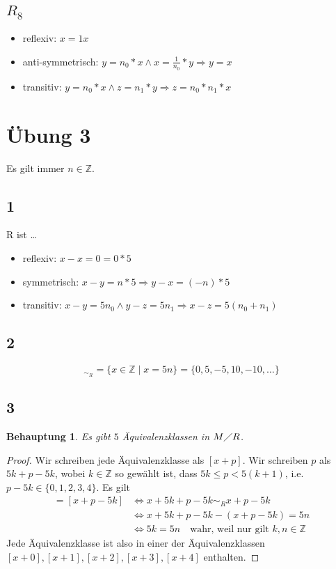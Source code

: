 \documentclass[a4paper,10pt]{article}
\newtheorem*{claim}{Behauptung}
\begin{document}
\subsection*{$R_8$}

\begin{itemize}
 \item reflexiv: $x = 1x$
 \item anti-symmetrisch: $y = n_0 * x \land x = \frac{1}{n_0} * y \Rightarrow y = x$
 \item transitiv: $y = n_0 * x \land z = n_1 * y \Rightarrow z = n_0 * n_1 * x$
\end{itemize}

\section*{Übung 3}

Es gilt immer $n \in \mathbb{Z}$.

\subsection*{1}

R ist \dots
\begin{itemize}
 \item reflexiv: $x - x = 0 = 0 * 5$
 \item symmetrisch: $x - y = n * 5 \Rightarrow y - x = (-n) * 5$
 \item transitiv: $x - y = 5n_0 \land y - z = 5n_1 \Rightarrow x - z = 5(n_0 + n_1)$
\end{itemize}

\subsection*{2}

\begin{equation*}
 [0]_{\sim_{R}} = \{x \in \mathbb{Z} \mid x = 5n\} = \{0, 5, -5, 10, -10, \dots\}
\end{equation*}

\subsection*{3}

\begin{claim}
 Es gibt $5$ Äquivalenzklassen in $M\diagup R$.
\end{claim}

\begin{proof}
 Wir schreiben jede Äquivalenzklasse als $[x + p]$.
 Wir schreiben $p$ als $5k + p - 5k$, wobei $k \in \mathbb{Z}$ so gewählt ist, dass $5k \le p < 5(k + 1)$, i.e. $p - 5k \in \{0, 1, 2, 3, 4\}$.
 Es gilt 
 \begin{align*}
  [x + 5k + p - 5k] = [x + p - 5k] & \Leftrightarrow x + 5k + p - 5k \sim_R x + p - 5k\\
  & \Leftrightarrow x + 5k + p - 5k - (x + p - 5k) = 5n\\
  & \Leftrightarrow 5k = 5n \quad \text{wahr, weil nur gilt } k, n \in \mathbb{Z}
 \end{align*}
 Jede Äquivalenzklasse ist also in einer der Äquivalenzklassen $[x + 0], [x + 1], [x + 2], [x + 3], [x + 4]$ enthalten.
\end{proof}
\end{document}
